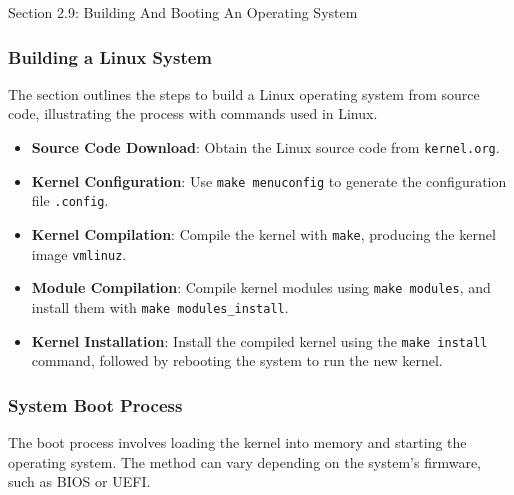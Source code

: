 \begin{notes}{Section 2.9: Building And Booting An Operating System}
    \subsubsection*{Building a Linux System}
    
    The section outlines the steps to build a Linux operating system from source code, illustrating the process with commands used in Linux.
    
    \begin{highlight}
    
    \begin{itemize}
        \item \textbf{Source Code Download}: Obtain the Linux source code from \texttt{kernel.org}.
        \item \textbf{Kernel Configuration}: Use \texttt{make menuconfig} to generate the configuration file \texttt{.config}.
        \item \textbf{Kernel Compilation}: Compile the kernel with \texttt{make}, producing the kernel image \texttt{vmlinuz}.
        \item \textbf{Module Compilation}: Compile kernel modules using \texttt{make modules}, and install them with \texttt{make modules\_install}.
        \item \textbf{Kernel Installation}: Install the compiled kernel using the \texttt{make install} command, followed by rebooting the system to run the new kernel.
    \end{itemize}
    
    \end{highlight}
    
    \subsubsection*{System Boot Process}
    
    The boot process involves loading the kernel into memory and starting the operating system. The method can vary depending on the system's firmware, such as BIOS or UEFI.
    
    \begin{highlight}
    

\end{highlight}
\end{notes}
